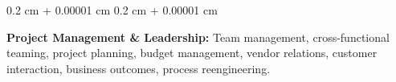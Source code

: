 \documentclass[10pt, letterpaper]{article}
\newenvironment{onecolentry}{
    \begin{adjustwidth}{
        0.2 cm + 0.00001 cm
    }{
        0.2 cm + 0.00001 cm
    }
}{
    \end{adjustwidth}
} %
\begin{document}
        \vspace{0.2 cm}

        \begin{onecolentry}
            \textbf{Project Management \& Leadership:} Team management, cross-functional teaming, project planning, budget management, vendor relations, customer interaction, business outcomes, process reengineering.
        \end{onecolentry}


    
\end{document}
